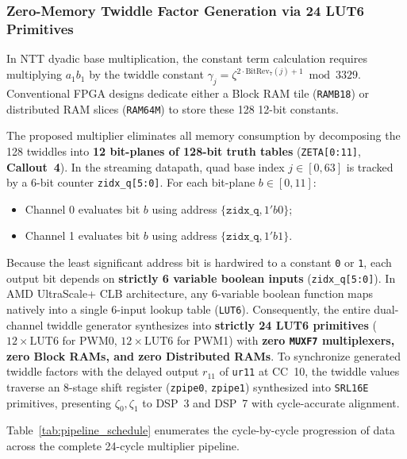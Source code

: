 \subsubsection{Zero-Memory Twiddle Factor Generation via 24 LUT6 Primitives}
\label{sec05b_twiddle_lut}

In NTT dyadic base multiplication, the constant term calculation requires multiplying $a_1 b_1$ by the twiddle constant $\gamma_j = \zeta^{2 \cdot \text{BitRev}_7(j) + 1} \bmod 3329$. Conventional FPGA designs dedicate either a Block RAM tile (\texttt{RAMB18}) or distributed RAM slices (\texttt{RAM64M}) to store these 128 12-bit constants.

The proposed multiplier eliminates all memory consumption by decomposing the 128 twiddles into \textbf{12 bit-planes of 128-bit truth tables} (\texttt{ZETA[0:11]}, \textbf{Callout~4}). In the streaming datapath, quad base index $j \in [0, 63]$ is tracked by a 6-bit counter \texttt{zidx\_q[5:0]}. For each bit-plane $b \in [0, 11]$:
\begin{itemize}
    \item Channel 0 evaluates bit $b$ using address $\{\texttt{zidx\_q}, 1'b0\}$;
    \item Channel 1 evaluates bit $b$ using address $\{\texttt{zidx\_q}, 1'b1\}$.
\end{itemize}
Because the least significant address bit is hardwired to a constant \texttt{0} or \texttt{1}, each output bit depends on \textbf{strictly 6 variable boolean inputs} (\texttt{zidx\_q[5:0]}). In AMD UltraScale+ CLB architecture, any 6-variable boolean function maps natively into a single 6-input lookup table (\texttt{LUT6}). Consequently, the entire dual-channel twiddle generator synthesizes into \textbf{strictly 24 LUT6 primitives} ($12 \times \text{LUT6}$ for PWM0, $12 \times \text{LUT6}$ for PWM1) with \textbf{zero \texttt{MUXF7} multiplexers, zero Block RAMs, and zero Distributed RAMs}. To synchronize generated twiddle factors with the delayed output $r_{11}$ of \texttt{ur11} at CC~10, the twiddle values traverse an 8-stage shift register (\texttt{zpipe0}, \texttt{zpipe1}) synthesized into \texttt{SRL16E} primitives, presenting $\zeta_0, \zeta_1$ to DSP~3 and DSP~7 with cycle-accurate alignment.

Table~\ref{tab:pipeline_schedule} enumerates the cycle-by-cycle progression of data across the complete 24-cycle multiplier pipeline.

